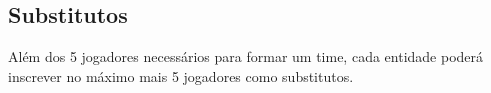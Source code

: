 \subsection{Substitutos}

Além dos 5 jogadores necessários para formar um time, cada entidade poderá inscrever no máximo mais 5 jogadores como substitutos.
